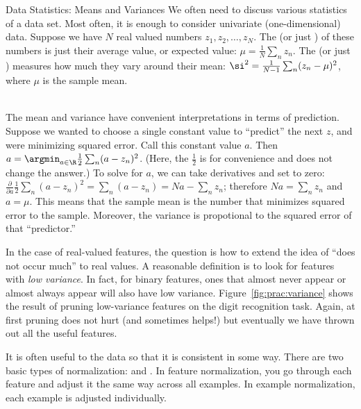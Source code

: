 \begin{mathreview}{Data Statistics: Means and Variances}
  We often need to discuss various statistics of a data set.
  Most often, it is enough to consider univariate (one-dimensional) data.
  Suppose we have $N$ real valued numbers $z_1, z_2, \dots, z_N$.
  The  (or just ) of these numbers is just their average value, or expected value: $\mu = \frac 1 N \sum_n z_n$.
  The  (or just ) measures how much they vary around their mean: $\si^2 = \frac 1 {N-1} \sum_n (z_n - \mu)^2$, where $\mu$ is the sample mean.

~\\

  The mean and variance have convenient interpretations in terms of prediction.
  Suppose we wanted to choose a single constant value to ``predict'' the next $z$, and were minimizing squared error.
  Call this constant value $a$.
  Then $a = \argmin_{a \in \R} \frac 1 2 \sum_n (a - z_n)^2$.
  (Here, the $\frac 1 2$ is for convenience and does not change the answer.)
  To solve for $a$, we can take derivatives and set to zero:
    $\frac \partial {\partial a} \frac 1 2 \sum_n (a - z_n)^2
     = \sum_n (a - z_n) = N a - \sum_n z_n$; therefore $N a = \sum_n z_n$ and $a = \mu$.
  This means that the sample mean is the number that minimizes squared error to the sample.
  Moreover, the variance is propotional to the squared error of that ``predictor.''
\end{mathreview}


In the case of real-valued features, the question is how to extend the
idea of ``does not occur much'' to real values.  A reasonable
definition is to look for features with \emph{low variance}.  In fact,
for binary features, ones that almost never appear or almost always
appear will also have low variance.  Figure~\ref{fig:prac:variance}
shows the result of pruning low-variance features on the digit
recognition task.  Again, at first pruning does not hurt (and
sometimes helps!) but eventually we have thrown out all the useful
features.


It is often useful to  the data so that it is
consistent in some way.  There are two basic types of normalization:
 and .
In feature normalization, you go through each feature and adjust it
the same way across all examples.  In example normalization, each
example is adjusted individually.

